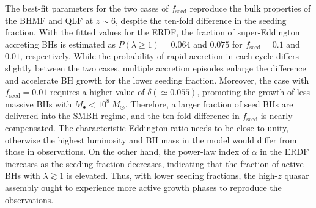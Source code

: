 \documentclass[twocolumn, twocolappendix]{aastex63}
\newcommand{\Msun}{M_\odot}
\newcommand{\fseed}{f_\mathrm{seed}}
\begin{document}
\begin{CJK*}{UTF8}{gbsn}
The best-fit parameters for the two cases of $\fseed$ reproduce the bulk properties of the BHMF and QLF at $z\sim 6$,
despite the ten-fold difference in the seeding fraction.
With the fitted values for the ERDF, the fraction of super-Eddington accreting BHs is estimated as 
$P(\lambda \geq 1)=0.064$ and $0.075$ for $\fseed=0.1$ and $0.01$, respectively.
While the probability of rapid accretion in each cycle differs slightly between the two cases,
multiple accretion episodes enlarge the difference and accelerate BH growth for the lower seeding fraction.
Moreover, the case with $\fseed=0.01$ requires a higher value of $\delta (\simeq 0.055)$,
promoting the growth of less massive BHs with $M_\bullet <10^8~\Msun$.
Therefore, a larger fraction of seed BHs are delivered into the SMBH regime,
and the ten-fold difference in $\fseed$ is nearly compensated.
The characteristic Eddington ratio needs to be close to unity, otherwise the highest luminosity and BH mass
in the model would differ from those in observations.
On the other hand, the power-law index of $\alpha$ in the ERDF increases as the seeding fraction decreases,
indicating that the fraction of active BHs with $\lambda \gtrsim 1$ is elevated. 
Thus, with lower seeding fractions, the high-$z$ quasar assembly ought to experience more active growth phases to reproduce the observations.


\end{CJK*}
\end{document}
